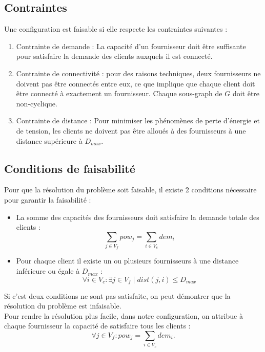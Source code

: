 \documentclass[12pt,a4paper]{article}
\begin{document}
\begin{multicols}{2}
\subsection{Contraintes}
Une configuration est faisable si elle respecte les contraintes suivantes :
\begin{enumerate}
\item Contrainte de demande : La capacité d'un fournisseur doit être suffisante pour satisfaire la demande des clients auxquels il est connecté.
\item Contrainte de connectivité : pour des raisons techniques, deux fournisseurs ne doivent pas être connectés entre eux, ce que implique que chaque client doit être connecté à exactement un fournisseur. Chaque sous-graph de $G$ doit être non-cyclique.
\item Contrainte de distance : Pour minimiser les phénomènes de perte d'énergie et de tension, les clients ne doivent pas être alloués à des fournisseurs à une distance supérieure à $D_{max}$.   
\end{enumerate}
\subsection{Conditions de faisabilité}
Pour que la résolution du problème soit faisable, il existe 2 conditions nécessaire pour garantir la faisabilité :
\begin{itemize}
\item La somme des capacités des fournisseurs doit satisfaire la demande totale des clients : \begin{equation*}
\sum_{j \in V_{f}}{pow_{j}}  = \sum_{i \in V_{c}}{dem_{i}}
\end{equation*}
\item Pour chaque client il existe un ou plusieurs fournisseurs à une distance inférieure ou égale à $D_{max}$ :
\begin{equation*}
\forall i \in V_{c} :  \exists j \in V_{f} \mid dist(j,i) \leq D_{max}
\end{equation*}
\end{itemize}
Si c'est deux conditions ne sont pas satisfaite, on peut démontrer que la résolution du problème est infaisable.\\
Pour rendre la résolution plus facile, dans notre configuration, on attribue à chaque fournisseur la capacité de satisfaire tous les clients : 
\begin{equation*}
\forall j \in V_{f} : pow_{j}=\sum_{i \in V_{c}}{dem_{i}}.
\end{equation*}

\end{multicols}
\end{document}

